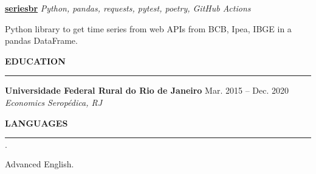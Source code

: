 \documentclass[12pt,letterpaper]{article}
\newenvironment{tightlist}
  {\begin{list}
    {$\cdot$}
    {
      \setlength{\leftmargin}{0em}
      \setlength{\itemsep}{-\smallskipamount}
    }
  }
{\end{list}}
\begin{document}
\smallskip

\textbf{\href{https://github.com/phelipetls/seriesbr}{seriesbr}} \hfill \emph{Python, pandas, requests, pytest, poetry, GitHub Actions}
{\parfillskip=0pt\par}
Python library to get time series from web APIs from BCB, Ipea, IBGE in a pandas DataFrame.

\medskip \textbf{EDUCATION} \medskip
\hrule

\textbf{Universidade Federal Rural do Rio de Janeiro} \hfill {Mar. 2015 -- Dec. 2020} \\
\emph{Economics} \hfill \emph{Seropédica, RJ} {\parfillskip=0pt\par}

\medskip \textbf{LANGUAGES} \medskip
\hrule

\begin{tightlist}
  \item Advanced English.
\end{tightlist}
\end{document}

